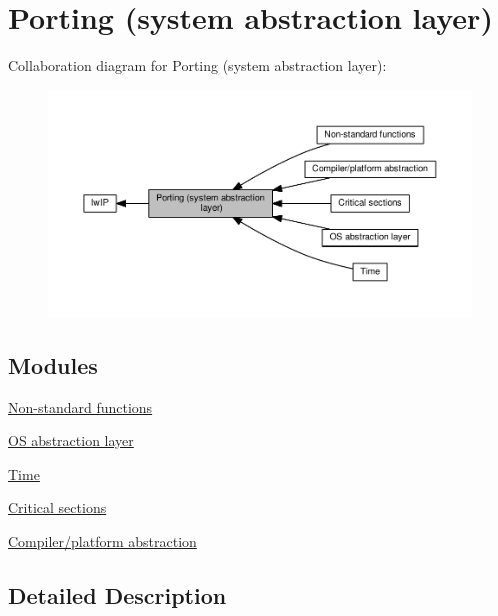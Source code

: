 \hypertarget{group__sys__layer}{}\section{Porting (system abstraction layer)}
\label{group__sys__layer}
Collaboration diagram for Porting (system abstraction layer)\+:
\nopagebreak
\begin{figure}[H]
\begin{center}
\leavevmode
\includegraphics[width=350pt]{group__sys__layer}
\end{center}
\end{figure}
\subsection*{Modules}
\begin{DoxyCompactItemize}
\item 
\hyperlink{group__sys__nonstandard}{Non-\/standard functions}
\item 
\hyperlink{group__sys__os}{O\+S abstraction layer}
\item 
\hyperlink{group__sys__time}{Time}
\item 
\hyperlink{group__sys__prot}{Critical sections}
\item 
\hyperlink{group__compiler__abstraction}{Compiler/platform abstraction}
\end{DoxyCompactItemize}


\subsection{Detailed Description}

\begin{DoxyVerbInclude}
\end{DoxyVerbInclude}
 
